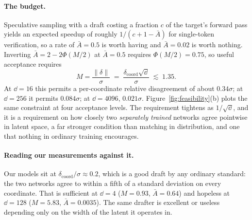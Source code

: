 \paragraph{The budget.} Speculative sampling with a draft costing a fraction $c$ of the target's
forward pass yields an expected speedup of roughly $1/(c + 1 - \bar{A})$ for single-token
verification, so a rate of $\bar{A} = 0.5$ is worth having and $\bar{A} = 0.02$ is worth nothing.
Inverting $\bar{A} = 2 - 2\Phi(M/2)$ at $\bar A = 0.5$ requires $\Phi(M/2) = 0.75$, so useful
acceptance requires
\[
M = \frac{\|\delta\|}{\sigma} \;=\; \frac{\delta_{\text{coord}}\sqrt{\dd}}{\sigma}
\;\lesssim\; 1.35 .
\]
At $\dd = 16$ this permits a per-coordinate relative disagreement of about $0.34\sigma$; at
$\dd = 256$ it permits $0.084\sigma$; at $\dd = 4096$, $0.021\sigma$. Figure~\ref{fig:feasibility}(b)
plots the same constraint at four acceptance levels. The requirement tightens as $1/\sqrt{\dd}$, and
it is a requirement on how closely two \emph{separately trained} networks agree pointwise in latent
space, a far stronger condition than matching in distribution, and one that nothing in ordinary
training encourages.

\paragraph{Reading our measurements against it.} Our models sit at
$\delta_{\text{coord}}/\sigma \approx 0.2$, which is a good draft by any ordinary standard: the two
networks agree to within a fifth of a standard deviation on every coordinate. That is sufficient at
$\dd = 4$ ($M = 0.93$, $\bar A = 0.64$) and hopeless at $\dd = 128$ ($M = 5.83$,
$\bar A = 0.0035$). The same drafter is excellent or useless depending only on the width of the
latent it operates in.

